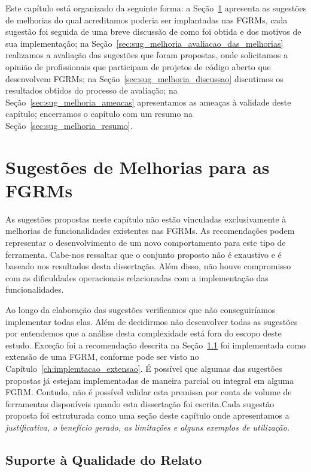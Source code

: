 Este capítulo está organizado da seguinte forma: a
Seção~\ref{sec:sug_melhoria_melhorando_as_ferraementas} apresenta as sugestões
de melhorias do qual acreditamos poderia ser implantadas nas FGRMs, cada
sugestão foi seguida de uma breve discussão de como foi obtida e dos motivos de
sua implementação; na Seção~\ref{sec:sug_melhoria_avaliacao_das_melhorias}
realizamos a avaliação das sugestões que foram propostas, onde solicitamos a
opinião de profissionais que participam de projetos de código aberto que
desenvolvem FGRMs; na Seção~\ref{sec:sug_melhoria_discussao} discutimos os
resultados obtidos do processo de avaliação; na
Seção~\ref{sec:sug_melhoria_ameacas} apresentamos as ameaças à validade deste
capítulo; encerramos o capítulo com um resumo na
Seção~\ref{sec:sug_melhoria_resumo}.

\section{Sugestões de Melhorias para as FGRMs}
\label{sec:sug_melhoria_melhorando_as_ferraementas}

As sugestões propostas neste capítulo não estão vinculadas exclusivamente à
melhorias de funcionalidades existentes nas FGRMs. As recomendações podem
representar o desenvolvimento de um novo comportamento para este tipo de
ferramenta. Cabe-nos ressaltar que o conjunto proposto não é exaustivo e é
baseado nos resultados desta dissertação. Além disso, não houve compromisso com
as dificuldades operacionais relacionadas com a implementação das
funcionalidades.

Ao longo da elaboração das sugestões verificamos que não conseguiríamos
implementar todas elas. Além de decidirmos não desenvolver todas as sugestões
por entendemos que a análise desta complexidade está fora do escopo deste
estudo. Exceção foi a recomendação descrita na
Seção~\ref{sub:supote_a_qualidade_do_relato} foi implementada como extensão de
uma FGRM, conforme pode ser visto no Capítulo~\ref{ch:implemtacao_extensao}.  É
possível que algumas das su\-ges\-tões propostas já estejam implementadas de
maneira parcial ou integral em alguma FGRM\@. Contudo, não é possível validar
esta premissa por conta de volume de ferramentas disponíveis quando esta
dissertação foi escrita.Cada sugestão proposta foi estruturada como uma seção
deste capítulo onde apresentamos a \textit{justificativa, o benefício gerado, as
	limitações e alguns exemplos de utilização.}

\subsection{Suporte à Qualidade do Relato}
\label{sub:supote_a_qualidade_do_relato}

